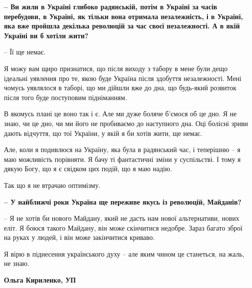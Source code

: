 \textbf{– Ви жили в Україні глибоко радянській, потім в Україні за часів перебудови, в
Україні, як тільки вона отримала незалежність, і в Україні, яка вже пройшла
декілька революцій за час своєї незалежності. А в якій Україні ви б хотіли
жити?}

– Її ще немає. 

Я можу вам щиро признатися, що після виходу з табору в мене були дещо ідеальні
уявлення про те, якою буде Україна після здобуття незалежності. Мені чомусь
уявлялося в таборі, що ми дійшли вже до дна, що будь-який розвиток після того
буде поступовим підніманням. 

В якомусь плані це воно так і є. Але ми дуже боляче б’ємося об це дно. Я не
знаю, чи це дно, чи ми його не пробиваємо до наступного дна. Оці болісні зриви
дають відчуття, що тої України, у якій я би хотів жити, ще немає. 

Але, коли я подивлюся на Україну, яка була в радянський час, і теперішню – я
маю можливість порівняти. Я бачу ті фантастичні зміни у суспільстві. І тому я
дякую Богу, що я є свідком цих подій, що я маю надію.

Так що я не втрачаю оптимізму.

{\bfseries 
– У найближчі роки Україна ще переживе якусь із революцій, Майданів? 
}

– Я не хотів би нового Майдану, який не дасть нам нової альтернативи, нових
еліт. Я боюся такого Майдану, він може скінчитися недобре. Зараз багато зброї
на руках у людей, і він може закінчитися криваво. 

Я вірю в піднесення українського духу – але яким чином це станеться, на жаль,
не знаю.

{\bfseries 
Ольга Кириленко, УП
}

